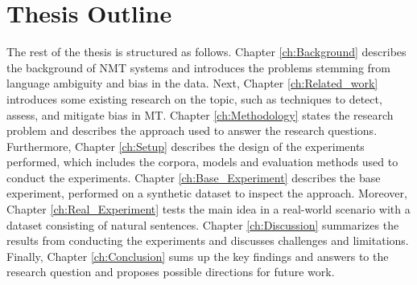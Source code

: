 \section{Thesis Outline}
\label{sec:Introduction:Outline}
The rest of the thesis is structured as follows. 
Chapter \ref{ch:Background} describes the background of NMT systems and introduces the problems stemming from language ambiguity and bias in the data. 
Next, Chapter \ref{ch:Related_work} introduces some existing research on the topic, such as techniques to detect, assess, and mitigate bias in MT. 
Chapter \ref{ch:Methodology} states the research problem and describes the approach used to answer the research questions. 
Furthermore, Chapter \ref{ch:Setup} describes the design of the experiments performed, which includes the corpora, models and evaluation methods used to conduct the experiments. 
Chapter \ref{ch:Base_Experiment} describes the base experiment, performed on a synthetic dataset to inspect the approach. Moreover, Chapter \ref{ch:Real_Experiment} tests the main idea in a real-world scenario with a dataset consisting of natural sentences.
Chapter \ref{ch:Discussion} summarizes the results from conducting the experiments and discusses challenges and limitations. 
Finally, Chapter \ref{ch:Conclusion} sums up the key findings and answers to the research question and proposes possible directions for future work.